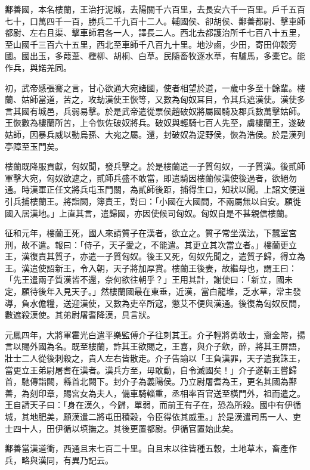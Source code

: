 \begin{pinyinscope}
鄯善國，本名樓蘭，王治扜泥城，去陽關千六百里，去長安六千一百里。戶千五百七十，口萬四千一百，勝兵二千九百十二人。輔國侯、卻胡侯、鄯善都尉、擊車師都尉、左右且渠、擊車師君各一人，譯長二人。西北去都護治所千七百八十五里，至山國千三百六十五里，西北至車師千八百九十里。地沙鹵，少田，寄田仰穀旁國。國出玉，多葭葦、檉柳、胡桐、白草。民隨畜牧逐水草，有驢馬，多橐它。能作兵，與婼羌同。

初，武帝感張騫之言，甘心欲通大宛諸國，使者相望於道，一歲中多至十餘輩。樓蘭、姑師當道，苦之，攻劫漢使王恢等，又數為匈奴耳目，令其兵遮漢使。漢使多言其國有城邑，兵弱易擊。於是武帝遣從票侯趙破奴將屬國騎及郡兵數萬擊姑師。王恢數為樓蘭所苦，上令恢佐破奴將兵。破奴與輕騎七百人先至，虜樓蘭王，遂破姑師，因暴兵威以動烏孫、大宛之屬。還，封破奴為浞野侯，恢為浩侯。於是漢列亭障至玉門矣。

樓蘭既降服貢獻，匈奴聞，發兵擊之。於是樓蘭遣一子質匈奴，一子質漢。後貳師軍擊大宛，匈奴欲遮之，貳師兵盛不敢當，即遣騎因樓蘭候漢使後過者，欲絕勿通。時漢軍正任文將兵屯玉門關，為貳師後距，捕得生口，知狀以聞。上詔文便道引兵捕樓蘭王。將詣闕，簿責王，對曰：「小國在大國間，不兩屬無以自安。願徙國入居漢地。」上直其言，遣歸國，亦因使候司匈奴。匈奴自是不甚親信樓蘭。

征和元年，樓蘭王死，國人來請質子在漢者，欲立之。質子常坐漢法，下蠶室宮刑，故不遣。報曰：「侍子，天子愛之，不能遣。其更立其次當立者。」樓蘭更立王，漢復責其質子，亦遣一子質匈奴。後王又死，匈奴先聞之，遣質子歸，得立為王。漢遣使詔新王，令入朝，天子將加厚賞。樓蘭王後妻，故繼母也，謂王曰：「先王遣兩子質漢皆不還，奈何欲往朝乎？」王用其計，謝使曰：「新立，國未定，願待後年入見天子。」然樓蘭國最在東垂，近漢，當白龍堆，乏水草，常主發導，負水儋糧，送迎漢使，又數為吏卒所寇，懲艾不便與漢通。後復為匈奴反間，數遮殺漢使。其弟尉屠耆降漢，具言狀。

元鳳四年，大將軍霍光白遣平樂監傅介子往刺其王。介子輕將勇敢士，齎金幣，揚言以賜外國為名。既至樓蘭，詐其王欲賜之，王喜，與介子飲，醉，將其王屏語，壯士二人從後刺殺之，貴人左右皆散走。介子告諭以「王負漢罪，天子遣我誅王，當更立王弟尉屠耆在漢者。漢兵方至，毋敢動，自令滅國矣！」介子遂斬王嘗歸首，馳傳詣闕，縣首北闕下。封介子為義陽侯。乃立尉屠耆為王，更名其國為鄯善，為刻印章，賜宮女為夫人，備車騎輜重，丞相率百官送至橫門外，祖而遣之。王自請天子曰：「身在漢久，今歸，單弱，而前王有子在，恐為所殺。國中有伊循城，其地肥美，願漢遣二將屯田積穀，令臣得依其威重。」於是漢遣司馬一人、吏士四十人，田伊循以填撫之。其後更置都尉。伊循官置始此矣。

鄯善當漢道衝，西通且末七百二十里。自且末以往皆種五穀，土地草木，畜產作兵，略與漢同，有異乃記云。


\end{pinyinscope}
